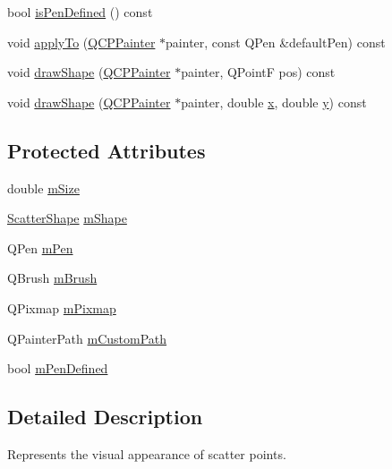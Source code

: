 \begin{DoxyCompactItemize}
bool \hyperlink{class_q_c_p_scatter_style_a7f1385a8d5e4f349a6b8030723fbd0f7}{is\+Pen\+Defined} () const 
\item 
void \hyperlink{class_q_c_p_scatter_style_a81817dfd404635f211e6ff2a04657d36}{apply\+To} (\hyperlink{class_q_c_p_painter}{Q\+C\+P\+Painter} $\ast$painter, const Q\+Pen \&default\+Pen) const 
\item 
void \hyperlink{class_q_c_p_scatter_style_a992d531ac471ec2b29bdec6aeb400a06}{draw\+Shape} (\hyperlink{class_q_c_p_painter}{Q\+C\+P\+Painter} $\ast$painter, Q\+Point\+F pos) const 
\item 
void \hyperlink{class_q_c_p_scatter_style_ae76811ac9f70ebf7a2b4c759853e6ed8}{draw\+Shape} (\hyperlink{class_q_c_p_painter}{Q\+C\+P\+Painter} $\ast$painter, double \hyperlink{_v_s_a___u_t_2_comparision_pictures_2_createtest_image_8m_a9336ebf25087d91c818ee6e9ec29f8c1}{x}, double \hyperlink{_v_s_a___u_t_2_comparision_pictures_2_createtest_image_8m_a2fb1c5cf58867b5bbc9a1b145a86f3a0}{y}) const 
\end{DoxyCompactItemize}
\subsection*{Protected Attributes}
\begin{DoxyCompactItemize}
\item 
double \hyperlink{class_q_c_p_scatter_style_a757da98671eb06b221979373ac2cec91}{m\+Size}
\item 
\hyperlink{class_q_c_p_scatter_style_adb31525af6b680e6f1b7472e43859349}{Scatter\+Shape} \hyperlink{class_q_c_p_scatter_style_af1b327f35f107ed108290187bbc8c7c6}{m\+Shape}
\item 
Q\+Pen \hyperlink{class_q_c_p_scatter_style_a0f6a85e6d1e3ae1ca1b6efb4d4cdfe17}{m\+Pen}
\item 
Q\+Brush \hyperlink{class_q_c_p_scatter_style_a1b9c6ab10aebcaf236f1f45d1d6d64d1}{m\+Brush}
\item 
Q\+Pixmap \hyperlink{class_q_c_p_scatter_style_a7697346c89b19d4cd1d8dd33319ec9e3}{m\+Pixmap}
\item 
Q\+Painter\+Path \hyperlink{class_q_c_p_scatter_style_a813cb074744dc5a2f59cc99d6a10c6f0}{m\+Custom\+Path}
\item 
bool \hyperlink{class_q_c_p_scatter_style_a84ef5aa591ddba07b440f597e1669e78}{m\+Pen\+Defined}
\end{DoxyCompactItemize}


\subsection{Detailed Description}
Represents the visual appearance of scatter points. 

